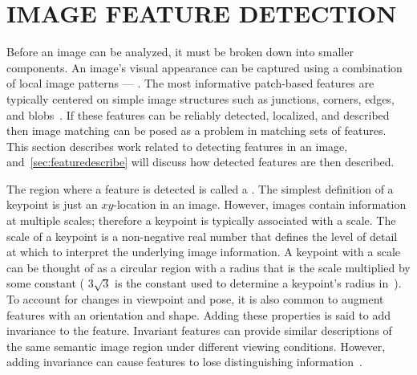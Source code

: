 \section{IMAGE FEATURE DETECTION}\label{sec:featuredetect}

    Before an image can be analyzed, it must be broken down into smaller components. An image's visual appearance
    can be captured using a combination of local image patterns --- . The most
    informative patch-based features are typically centered on simple image structures such as junctions, corners,
    edges, and blobs~\cite{tuytelaars_local_2008}. If these features can be reliably detected, localized, and
    described then image matching can be posed as a problem in matching sets of features. This section describes
    work related to detecting features in an image, and~\cref{sec:featuredescribe} will discuss how detected
    features are then described.

    The region where a feature is detected is called a . The simplest definition of a keypoint
    is just an $xy$-location in an image. However, images contain information at multiple scales; therefore a
    keypoint is typically associated with a scale. The scale of a keypoint is a non-negative real number that
    defines the level of detail at which to interpret the underlying image information. A keypoint with a scale can
    be thought of as a circular region with a radius that is the scale multiplied by some constant %
    (\eg{} $3\sqrt{3}$ is the constant used to determine a keypoint's radius in~\cite{perdoch_efficient_2009}). To
    account for changes in viewpoint and pose, it is also common to augment features with an orientation and shape.
    Adding these properties is said to add invariance to the feature. Invariant features can provide similar
    descriptions of the same semantic image region under different viewing conditions. However, adding invariance
    can cause features to lose distinguishing information~\cite{mikolajczyk_comparison_2005,
    tuytelaars_local_2008, perdoch_efficient_2009, lowe_distinctive_2004}.

